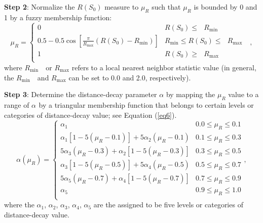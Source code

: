 \documentclass[fleqn,11pt]{wlscirep}
\begin{document}
\textbf{Step 2}: Normalize the $R\left( {S_0 } \right)$ measure to $\mu _R $ 
such that $\mu _R $ is bounded by 0 and 1 by a fuzzy membership function: 
\begin{equation}
\label{eq5}
\mu _R =\left\{ {\begin{array}{ll}
	0&R\left( {S_0 } \right)\le \mbox{ }R_{\min } \mbox{ } \\ 
	0.5-0.5\cos \left[ {\frac{\pi }{R_{\max } }\left( {R\left( {S_0 } 
			\right)-R_{\min } } \right)} \right]&R_{\min } \le R\left( {S_0 } 
	\right)\le \mbox{ }R_{\max } \mbox{ } \\ 
	1&R\left( {S_0 } \right)\ge \mbox{ }R_{\max } \\ 
	\end{array}} \right.,
\end{equation}
where $R_{\min } \mbox{ }$ or $R_{\max } $ refers to a local nearest neighbor 
statistic value (in general, the $R_{\min } \mbox{ }$ and $R_{\max } $ can 
be set to 0.0 and 2.0, respectively).

\textbf{Step 3}: Determine the distance-decay parameter $\alpha $ by mapping 
the $\mu _{R}$ value to a range of $\alpha _{ }$ by a triangular 
membership function that belongs to certain levels or categories of 
distance-decay value; see Equation (\ref{eq6}).
\begin{equation}
\label{eq6}
\alpha \left( {\mu _R } \right)=\left\{ {{\begin{array}{ll}
		{\alpha _1 } & {\mbox{0.0}\le \mu _R \le \mbox{0.1}} \\
		{\alpha _1 \left[ {1-5\left( {\mu _R -0\mbox{.}1} \right)} \right]+5\alpha 
			_2 \left( {\mu _R -0\mbox{.}1} \right)} & {\mbox{0.1}\le \mu _R \le 
			\mbox{0.3}} \\
		{5\alpha _3 \left( {\mu _R -0\mbox{.}3} \right)+\alpha _2 \left[ {1-5\left( 
				{\mu _R -0\mbox{.}3} \right)} \right]} & {\mbox{0.3}\le \mu _R \le 
			0\mbox{.}5} \\
		{\alpha _3 \left[ {1-5\left( {\mu _R -0\mbox{.5}} \right)} \right]+5\alpha 
			_4 \left( {\mu _R -0\mbox{.}5} \right)} & {\mbox{0.5}\le \mu _R \le 
			\mbox{0.7}} \\
		{5\alpha _5 \left( {\mu _R -0\mbox{.7}} \right)+\alpha _4 \left[ {1-5\left( 
				{\mu _R -0\mbox{.7}} \right)} \right]} & {\mbox{0.7}\le \mu _R \le 
			\mbox{0.9}} \\
		{\alpha _5 } & {\mbox{0.9}\le \mu _R \le \mbox{1.0}} \\
		\end{array} }} \right.,
\end{equation}
where the $\alpha _{1}$, $\alpha _{2}$, $\alpha _{3}$, $\alpha 
_{4}$, $\alpha _{5}$ are the assigned to be five levels or categories of 
distance-decay value.
\end{document}
